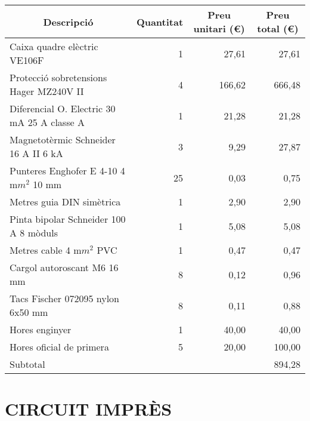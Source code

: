 \begin{table}[H]
  \begin{center}
    \begin{tabularx} {\textwidth} {|X|r|r|r|} \hline
  \multicolumn{1}{|c|}{Descripció} &  \multicolumn{1}{c|}{Quantitat} & \multicolumn{1}{c|}{Preu unitari (€)} &  \multicolumn{1}{c|}{Preu total (€)}\\ \hline \hline
    Caixa quadre elèctric VE106F & 1     & 27,61 & 27,61 \\ \hline
    Protecció sobretensions Hager MZ240V II & 4     & 166,62 & 666,48 \\ \hline
    Diferencial O. Electric 30 mA 25 A classe A & 1     & 21,28 & 21,28 \\ \hline
    Magnetotèrmic Schneider 16 A II 6 kA & 3     & 9,29  & 27,87 \\ \hline
    Punteres Enghofer E 4-10 4 m$m^2$ 10 mm & 25    & 0,03  & 0,75 \\ \hline
    Metres guia DIN simètrica & 1     & 2,90  & 2,90 \\ \hline
    Pinta bipolar Schneider 100 A 8 mòduls & 1     & 5,08  & 5,08 \\ \hline
    Metres cable 4 m$m^2$ PVC & 1     & 0,47  & 0,47 \\ \hline
    Cargol autoroscant M6 16 mm & 8     & 0,12  & 0,96 \\ \hline
    Tacs Fischer 072095 nylon 6x50 mm & 8     & 0,11  & 0,88 \\ \hline
    Hores enginyer & 1     & 40,00 & 40,00 \\ \hline
    Hores oficial de primera & 5     & 20,00 & 100,00 \\ \hline  \hline
    \multicolumn{3}{|l}{Subtotal} & 894,28 \\ \hline

    \end{tabularx}%
  \end{center}

  \label{tab:addlabel}%
\end{table}%




\section{\uppercase{Circuit imprès}}

